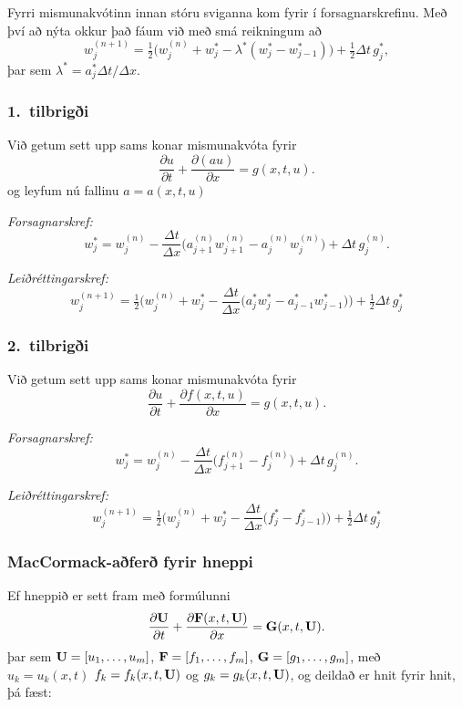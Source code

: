 \documentclass[icelandic,a4paper,12pt]{article}
\begin{document}
\smallskip
Fyrri mismunakvótinn innan stóru sviganna kom fyrir í
forsagnarskrefinu.  Með því að nýta okkur það fáum við með smá
reikningum að 
$$
w_j^{(n+1)}=\tfrac 12
\big(w_j^{(n)}+w_j^*-\lambda^*(w_j^*-w_{j-1}^*)\big)
+\tfrac 12 \Delta t\, g_j^*,
$$
þar sem $\lambda^*=a_j^*\Delta t/\Delta x$.



\subsubsection{1.~tilbrigði} 
Við getum sett upp sams konar mismunakvóta fyrir 
$$
\dfrac{\partial u}{\partial t}
+\dfrac{\partial (au)}{\partial x}=g(x,t,u).
$$
og leyfum nú fallinu $a=a(x,t,u)$

\smallskip
{\it Forsagnarskref:} 
$$
w_j^*=w_j^{(n)}-\dfrac{\Delta t}{\Delta x}\big( 
a_{j+1}^{(n)}w_{j+1}^{(n)}-a_j^{(n)}w_j^{(n)}\big)+\Delta t\, g_j^{(n)}.
$$

\smallskip
{\it Leiðréttingarskref:}
$$
w_j^{(n+1)}=\tfrac 12\big(w_j^{(n)} +w_j^*-\dfrac{\Delta t}{\Delta x}
\big(a_j^*w_j^*-a_{j-1}^*w_{j-1}^*\big) \big)+\tfrac 12 \Delta t\, g_j^*
$$



\subsubsection{2.~tilbrigði} 
Við getum sett upp sams konar mismunakvóta fyrir 
$$
\dfrac{\partial u}{\partial t}
+\dfrac{\partial f(x,t,u)}{\partial x}=g(x,t,u).
$$

\smallskip
{\it Forsagnarskref:} 
$$
w_j^*=w_j^{(n)}-\dfrac{\Delta t}{\Delta x}\big( 
f_{j+1}^{(n)}-f_j^{(n)}\big)+\Delta t\, g_j^{(n)}.
$$

\smallskip
{\it Leiðréttingarskref:}
$$
w_j^{(n+1)}=\tfrac 12\big(w_j^{(n)} +w_j^*-\dfrac{\Delta t}{\Delta x}
\big(f_j^*-f_{j-1}^*\big) \big)+\tfrac 12 \Delta t\, g_j^*
$$



\subsubsection{MacCormack-aðferð fyrir hneppi} 
Ef hneppið er sett fram með formúlunni
$$
\dfrac{\partial \mbox{${\bf U}$}}{\partial t}
+\dfrac{\partial \mbox{${\bf F}$}(x,t,\mbox{${\bf U}$})}{\partial x}=\mbox{${\bf G}$}(x,t,\mbox{${\bf U}$}).
$$
þar sem $\mbox{${\bf U}$}=[u_1,\dots,u_m]$, $\mbox{${\bf F}$}=[f_1,\dots,f_m]$,
$\mbox{${\bf G}$}=[g_1,\dots,g_m]$,  með $u_k=u_k(x,t)$
$f_k=f_k(x,t,\mbox{${\bf U}$})$ og $g_k=g_k(x,t,\mbox{${\bf U}$})$,
og deildað er hnit fyrir hnit, þá fæst:
\end{document}
